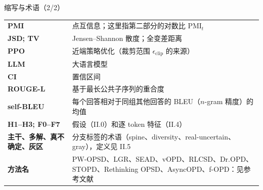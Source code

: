 \documentclass[aspectratio=169,11pt]{beamer}
\begin{document}
\begin{frame}{缩写与术语（2/2）}
\footnotesize
\setlength{\tabcolsep}{4pt}\renewcommand{\arraystretch}{1.2}
\begin{tabularx}{\linewidth}{@{}>{\bfseries}l Y@{}}
\toprule
PMI & 点互信息；这里指第二部分的对数比 $\mathrm{PMI}_t$\\
JSD; TV & Jensen--Shannon 散度；全变差距离\\
PPO & 近端策略优化（裁剪范围 $\epsilon_{\mathrm{clip}}$ 的来源）\\
LLM & 大语言模型\\
CI & 置信区间\\
ROUGE-L & 基于最长公共子序列的重合度\\
self-BLEU & 每个回答相对于同组其他回答的 BLEU（$n$-gram 精度）的均值\\
H1--H3; F0--F7 & 假设（II.0）和逐 token 特征（II.4）\\
主干、多解、真不确定、灰区 & 分支标签的术语（spine、diversity、real-uncertain、gray），定义见 II.5\\
方法名 & PW-OPSD、LGR、SEAD、vOPD、RLCSD、Dr.OPD、STOPD、Rethinking OPSD、AsyncOPD、f-OPD：见参考文献\\
\bottomrule
\end{tabularx}
\end{frame}
\end{document}

